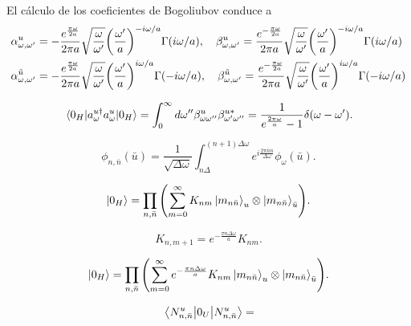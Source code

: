 El cálculo de los coeficientes de Bogoliubov conduce a 
\begin{equation}
  \begin{aligned}
    &\alpha_{\omega,\omega'}^{ u} = -\frac{e^{\frac{\pi\omega}{2 a}}}{2\pi a}\sqrt{\frac{\omega}{\omega'}}\qty(\frac{\omega'}{a})^{-i\omega/a}
    \Gamma(i\omega/a), \quad
    \beta_{\omega,\omega'}^{ u} = \frac{e^{-\frac{\pi\omega}{2 a}}}{2\pi a}\sqrt{\frac{\omega}{\omega'}}\qty(\frac{\omega'}{a})^{-i\omega/a}
    \Gamma(i\omega/a)\\
    &\alpha_{\omega,\omega'}^{\tilde u} = -\frac{e^{\frac{\pi\omega}{2 a}}}{2\pi a}\sqrt{\frac{\omega}{\omega'}}\qty(\frac{\omega'}{a})^{i\omega/a}
    \Gamma(-i\omega/a), \quad
    \beta_{\omega,\omega'}^{\tilde u} = \frac{e^{-\frac{\pi\omega}{2 a}}}{2\pi a}\sqrt{\frac{\omega}{\omega'}}\qty(\frac{\omega'}{a})^{i\omega/a} 
    \Gamma(-i\omega/a)
  \end{aligned}
\end{equation}

\begin{equation}
  \ev{a_\omega^{u\dagger}a_\omega^u}{0_H} = \int_0^\infty d\omega'' \beta_{\omega\omega''}^u
  \beta_{\omega'\omega''}^{u*} = \frac{1}{e^{\frac{2\pi\omega}{a}}-1}\delta(\omega-\omega').
\end{equation}

\begin{equation}
  \phi_{n,\bar n}(\bar u)=\frac{1}{\sqrt{\Delta \omega}}\int_{n\Delta}^{(n+1)\Delta \omega} e^{i\frac{2\pi \bar n n}{\Delta \omega}}
  \phi_\omega(\bar u).
\end{equation}


\begin{equation}
  \ket{0_H} = \prod_{n,\bar n} \qty(\sum_{m=0}^\infty K_{nm} \ket{m_{n\bar n}}_u\otimes \ket{m_{n\bar n}}_{\bar u}).
\end{equation}

\begin{equation}
  K_{n,m+1}=e^{-\frac{\pi n\Delta \omega }{a}}K_{nm}.
\end{equation}

\begin{equation}
  \ket{0_H} = \prod_{n,\bar n} \qty(\sum_{m=0}^\infty e^{-\frac{\pi n\Delta \omega }{a}}K_{nm}\ket{m_{n\bar n}}_u\otimes \ket{m_{n\bar n}}_{\bar u}).
\end{equation}

\begin{equation}
  \ev{0_U}{N^u_{n,\bar n}} =
\end{equation}

